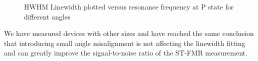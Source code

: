 \begin{figure}[!ht]
\centering
{}
\caption{HWHM Linewidth plotted versus resonance frequency at P state for different angles}
\end{figure}

We have measured devices with other sizes and have reached the same conclusion that introducing small angle misalignment is not affecting the linewidth fitting and can greatly improve the signal-to-noise ratio of the ST-FMR measurement.